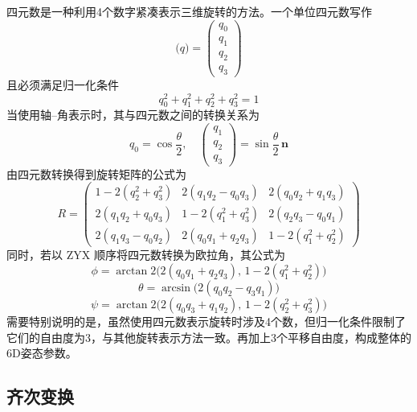 四元数是一种利用4个数字紧凑表示三维旋转的方法。一个单位四元数写作
\begin{equation}
	\mathbf(q) = \begin{pmatrix} q_0 \\ q_1 \\ q_2 \\ q_3 \end{pmatrix}
\end{equation}
且必须满足归一化条件
\begin{equation}
	q_0^2 + q_1^2 + q_2^2 + q_3^2 = 1
\end{equation}
当使用轴–角表示时，其与四元数之间的转换关系为
\begin{equation}
	q_0 = \cos\frac{\theta}{2}, \quad \begin{pmatrix} q_1 \\ q_2 \\ q_3 \end{pmatrix} = \sin\frac{\theta}{2}\, \mathbf{n}
\end{equation}
由四元数转换得到旋转矩阵的公式为
\begin{equation}
	R = \begin{pmatrix}
		1-2(q_2^2+q_3^2) & 2(q_1q_2 - q_0q_3) & 2(q_0q_2+q_1q_3) \\
		2(q_1q_2+q_0q_3) & 1-2(q_1^2+q_3^2) & 2(q_2q_3 - q_0q_1) \\
		2(q_1q_3 - q_0q_2) & 2(q_0q_1+q_2q_3) & 1-2(q_1^2+q_2^2)
	\end{pmatrix}
\end{equation}
同时，若以 ZYX 顺序将四元数转换为欧拉角，其公式为
\begin{equation}
	\phi = \arctan2\bigl(2(q_0q_1+q_2q_3),\, 1-2(q_1^2+q_2^2)\bigr)
\end{equation}
\begin{equation}
	\theta = \arcsin\bigl(2(q_0q_2-q_3q_1)\bigr)
\end{equation}
\begin{equation}
	\psi = \arctan2\bigl(2(q_0q_3+q_1q_2),\, 1-2(q_2^2+q_3^2)\bigr)
\end{equation}
需要特别说明的是，虽然使用四元数表示旋转时涉及4个数，但归一化条件限制了它们的自由度为3，与其他旋转表示方法一致。再加上3个平移自由度，构成整体的6D姿态参数。

\subsection{齐次变换}

